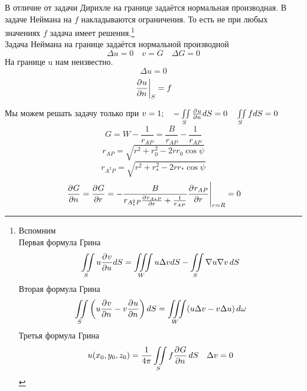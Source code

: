 В отличие от задачи Дирихле на границе задаётся нормальная производная. В задаче Неймана на $f$ накладываются ограничения. То есть не при любых значениях $f$ задача имеет решения.\footnote{Вспомним\\
Первая формула Грина \[
	\iint\limits_S u \frac{\partial^{}v}{\partial u^{}} dS = \iiint\limits_{W} u \Delta v d S - \iint\limits\limits_S \nabla u \nabla v\, dS
\]
Вторая формула Грина \[
	\iint\limits_S \left( u \frac{\partial^{}v}{\partial n^{}} - v \frac{\partial^{}u}{\partial n^{}}\right) dS = \iiint\limits_{W} (u \Delta v - v \Delta u)\, d \omega
\]
Третья формула Грина \[
	u(x_0, y_0, z_0) = \frac{1}{4 \pi} \iint\limits_S f \frac{\partial^{}G}{\partial n^{}}\, dS \quad \Delta v = 0
\]}\\





Задача Неймана на границе задаётся нормальной производной
\[
	\Delta u = 0 \quad v = G \quad  \Delta G = 0
\]
На границе u нам неизвестно. \\
\[
	\Delta u = 0
\]
\[
	\left. \frac{\partial^{}u}{\partial n^{}} \right|_S = f
\]

Мы можем решать задачу только при  $v=1; \quad - \iint\limits_S \frac{\partial^{}u}{\partial n^{}} dS = 0 \quad \iint\limits_S f dS = 0$
\[
	G = W - \frac{1}{r_{AP}} = \frac{B}{r_{AP}} - \frac{1}{r_{AP}}
\]
\[
	r_{AP} = \sqrt{r^2 + r_0^2 - 2 r r_0 \cos \psi}
\]
\[
	r_{A^2P} = \sqrt{r^2 + r_*^2 - 2 r r_* \cos \psi}
\]
\[
	\left. \frac{\partial^{}G}{\partial n^{}} = \frac{\partial^{}G}{\partial r^{}} = - \frac{B}{r_{A_*^2P} \frac{\partial^{}r_{A*P}}{\partial r^{}} + \frac{1}{r_{AP}}} \frac{\partial^{}r_{AP}}{\partial r^{}} \right|_{r = R} = 0
\]

